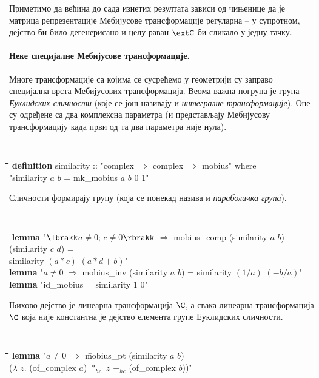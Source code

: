 Приметимо да већина до сада изнетих резултата зависи од чињенице да је
матрица репрезентације Мебијусове трансформације регуларна -- у
супротном, дејство би било дегенерисано и целу раван $\extC$ би
сликало у једну тачку.

\paragraph{Неке специјалне Мебијусове трансформације.}
Многе трансформације са којима се сусрећемо у геометрији су заправо
специјална врста Мебијусових трансформација. Веома важна погрупа је
група \emph{Еуклидских сличности} (које се још називају и
\emph{интегралне трансформације}). Оне су одређене са два комплексна
параметра (и представљају Мебијусову трансформацију када први од та
два параметра није нула). {\tt
\begin{tabbing}
\hspace{5mm}\=\hspace{5mm}\=\hspace{5mm}\=\hspace{5mm}\=\hspace{5mm}\=\kill
{\bf definition} similarity :: "complex $\Rightarrow$ complex $\Rightarrow$ mobius" where \\
\>"similarity $a$ $b$ = mk\_mobius $a$ $b$ 0 1"
\end{tabbing}
}
\noindent Сличности формирају групу (која се понекад назива и
\emph{параболичка група}).  {\tt
\begin{tabbing}
\hspace{5mm}\=\hspace{5mm}\=\hspace{5mm}\=\hspace{5mm}\=\hspace{5mm}\=\kill
{\bf lemma} "$\lbrakk$$a\neq 0$; $c \neq 0$$\rbrakk$ $\Longrightarrow$ mobius\_comp (similarity $a$ $b$) (similarity $c$ $d$) = \\
\>similarity $(a*c)$ $(a*d+b)$"\\
{\bf lemma} "$a \neq 0$ $\Longrightarrow$ mobius\_inv (similarity $a$ $b$) = similarity $(1/a)$ $(-b/a)$"\\
{\bf lemma} "id\_mobius = similarity $1$ $0$"\\
\end{tabbing}
}

Њихово дејство је линеарна трансформација $\C$, а свака линеарна
трансформација $\C$ која није константна је дејство елемента групе
Еуклидских сличности.  {\tt
\begin{tabbing}
\hspace{5mm}\=\hspace{5mm}\=\hspace{5mm}\=\hspace{5mm}\=\hspace{5mm}\=\kill
{\bf lemma} "$a \neq 0$ $\Longrightarrow$ \=mobius\_pt (similarity $a$ $b$) = \\
\>($\lambda$ $z$. (of\_complex $a$) $*_{hc}$ $z$ $+_{hc}$ (of\_complex $b$))"
\end{tabbing}
}

